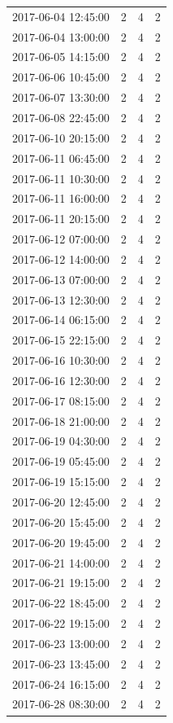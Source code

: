 \begin{tabular}{lrrr}
2017-06-04 12:45:00 & 2 & 4 & 2 \\
2017-06-04 13:00:00 & 2 & 4 & 2 \\
2017-06-05 14:15:00 & 2 & 4 & 2 \\
2017-06-06 10:45:00 & 2 & 4 & 2 \\
2017-06-07 13:30:00 & 2 & 4 & 2 \\
2017-06-08 22:45:00 & 2 & 4 & 2 \\
2017-06-10 20:15:00 & 2 & 4 & 2 \\
2017-06-11 06:45:00 & 2 & 4 & 2 \\
2017-06-11 10:30:00 & 2 & 4 & 2 \\
2017-06-11 16:00:00 & 2 & 4 & 2 \\
2017-06-11 20:15:00 & 2 & 4 & 2 \\
2017-06-12 07:00:00 & 2 & 4 & 2 \\
2017-06-12 14:00:00 & 2 & 4 & 2 \\
2017-06-13 07:00:00 & 2 & 4 & 2 \\
2017-06-13 12:30:00 & 2 & 4 & 2 \\
2017-06-14 06:15:00 & 2 & 4 & 2 \\
2017-06-15 22:15:00 & 2 & 4 & 2 \\
2017-06-16 10:30:00 & 2 & 4 & 2 \\
2017-06-16 12:30:00 & 2 & 4 & 2 \\
2017-06-17 08:15:00 & 2 & 4 & 2 \\
2017-06-18 21:00:00 & 2 & 4 & 2 \\
2017-06-19 04:30:00 & 2 & 4 & 2 \\
2017-06-19 05:45:00 & 2 & 4 & 2 \\
2017-06-19 15:15:00 & 2 & 4 & 2 \\
2017-06-20 12:45:00 & 2 & 4 & 2 \\
2017-06-20 15:45:00 & 2 & 4 & 2 \\
2017-06-20 19:45:00 & 2 & 4 & 2 \\
2017-06-21 14:00:00 & 2 & 4 & 2 \\
2017-06-21 19:15:00 & 2 & 4 & 2 \\
2017-06-22 18:45:00 & 2 & 4 & 2 \\
2017-06-22 19:15:00 & 2 & 4 & 2 \\
2017-06-23 13:00:00 & 2 & 4 & 2 \\
2017-06-23 13:45:00 & 2 & 4 & 2 \\
2017-06-24 16:15:00 & 2 & 4 & 2 \\
2017-06-28 08:30:00 & 2 & 4 & 2 \\

\end{tabular}
